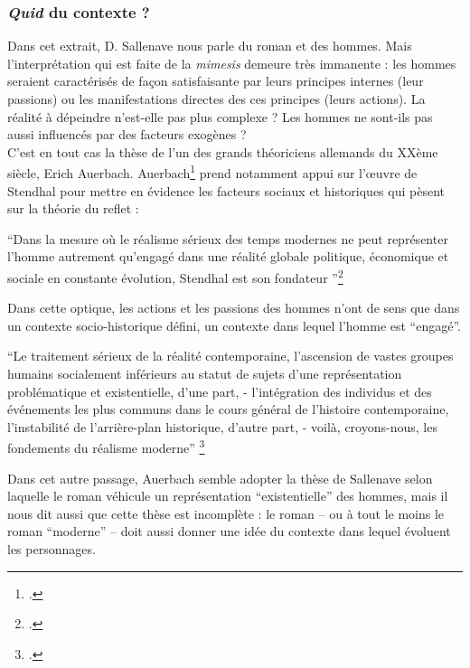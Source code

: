 \documentclass[a4paper,10pt]{article}
\begin{document}
			\subsubsection{\textit{Quid} du contexte ?}
				Dans cet extrait, D. Sallenave nous parle du roman et des hommes. Mais l'interprétation qui est faite de la \textit{mimesis} demeure très immanente : les hommes seraient caractérisés de façon satisfaisante par leurs principes internes (leur  passions) ou les manifestations directes des ces principes (leurs actions). La réalité à dépeindre n'est-elle pas plus complexe ? Les hommes ne sont-ils pas aussi influencés par des facteurs exogènes ?\\
				C'est en tout cas la thèse de l'un des grands théoriciens allemands du XXème siècle, Erich Auerbach. Auerbach\footcite{Auerbach1946} prend notamment appui sur l'œuvre de Stendhal pour mettre en évidence les facteurs sociaux et historiques qui pèsent sur la théorie du reflet :
				\begin{center}
					\footnotesize
					\begin{minipage}{0.7\textwidth}
						``Dans la mesure où le réalisme sérieux des temps modernes ne peut représenter l’homme autrement qu’engagé dans une réalité globale
						politique, économique et sociale en constante évolution, Stendhal est son fondateur ''\footcite[p.~459]{Auerbach1946}
					\end{minipage}
				\end{center}
				Dans cette optique, les actions et les passions des hommes n'ont de sens que dans un contexte socio-historique défini, un contexte dans lequel l'homme est ``engagé''.
				\begin{center}
					\footnotesize
					\begin{minipage}{0.7\textwidth}
						``Le traitement sérieux de la réalité contemporaine, l’ascension de vastes groupes humains socialement inférieurs au statut de sujets d’une représentation problématique et
						existentielle, d’une part, - l’intégration des individus et des événements les plus communs
						dans le cours général de l’histoire contemporaine, l’instabilité de l’arrière-plan historique,
						d’autre part, - voilà, croyons-nous, les fondements du réalisme moderne'' \footcite[p.~487]{Auerbach1946}
					\end{minipage}
				\end{center}
				Dans cet autre passage, Auerbach semble adopter la thèse de Sallenave selon laquelle le roman véhicule un représentation ``existentielle'' des hommes, mais il nous dit aussi que cette thèse est incomplète : le roman -- ou à tout le moins le roman ``moderne'' -- doit aussi donner une idée du contexte dans lequel évoluent les personnages.
\end{document}
